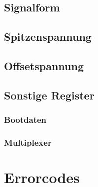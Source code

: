 \documentclass[a4paper,12pt]{article}
\begin{document}
\subsection{Signalform}
\subsection{Spitzenspannung}
\subsection{Offsetspannung}
\subsection{Sonstige Register}
\subsubsection{Bootdaten}
\subsubsection{Multiplexer}
\section{Errorcodes}
\end{document}
